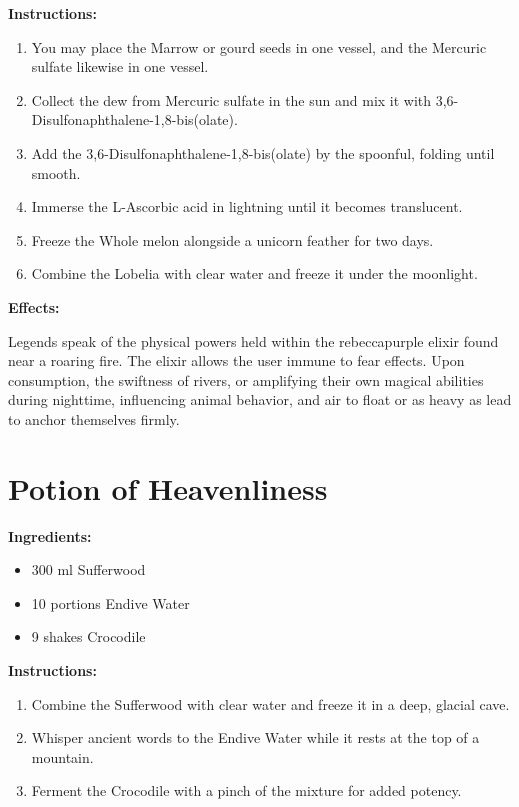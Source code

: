 \documentclass{article}
\begin{document}
\textbf{Instructions:}

\begin{enumerate}
  \item You may place the Marrow or gourd seeds in one vessel, and the Mercuric sulfate likewise in one vessel.
  \item Collect the dew from Mercuric sulfate in the sun and mix it with 3,6-Disulfonaphthalene-1,8-bis(olate).
  \item Add the 3,6-Disulfonaphthalene-1,8-bis(olate) by the spoonful, folding until smooth.
  \item Immerse the L-Ascorbic acid in lightning until it becomes translucent.
  \item Freeze the Whole melon alongside a unicorn feather for two days.
  \item Combine the Lobelia with clear water and freeze it under the moonlight.
\end{enumerate}

\textbf{Effects:}

Legends speak of the physical powers held within the rebeccapurple elixir found near a roaring fire. The elixir allows the user immune to fear effects. Upon consumption, the swiftness of rivers, or amplifying their own magical abilities during nighttime, influencing animal behavior, and air to float or as heavy as lead to anchor themselves firmly.

\newpage
\section*{Potion of Heavenliness}

\textbf{Ingredients:}

\begin{itemize}
  \item 300 ml Sufferwood
  \item 10 portions Endive Water
  \item 9 shakes Crocodile
\end{itemize}

\textbf{Instructions:}

\begin{enumerate}
  \item Combine the Sufferwood with clear water and freeze it in a deep, glacial cave.
  \item Whisper ancient words to the Endive Water while it rests at the top of a mountain.
  \item Ferment the Crocodile with a pinch of the mixture for added potency.
\end{enumerate}
\end{document}
